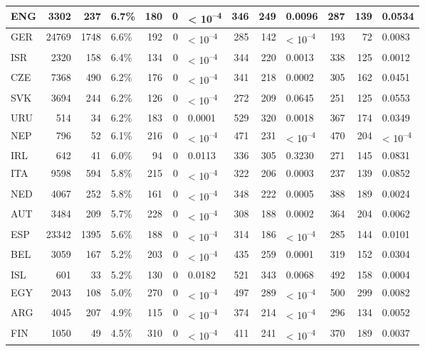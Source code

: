 \begin{tabular}{l|r|r|l|r|r|l|r|r|l|r|r|l}
\hline
ENG & 3302 & 237 & 6.7\% & 180 & 0 & < 10\textsuperscript{--4} & 346 & 249 & 0.0096 & 287 & 139 & 0.0534\\
\hline
GER & 24769 & 1748 & 6.6\% & 192 & 0 & < 10\textsuperscript{--4} & 285 & 142 & < 10\textsuperscript{--4} & 193 & 72 & 0.0083\\
\hline
ISR & 2320 & 158 & 6.4\% & 134 & 0 & < 10\textsuperscript{--4} & 344 & 220 & 0.0013 & 338 & 125 & 0.0012\\
\hline
CZE & 7368 & 490 & 6.2\% & 176 & 0 & < 10\textsuperscript{--4} & 341 & 218 & 0.0002 & 305 & 162 & 0.0451\\
\hline
SVK & 3694 & 244 & 6.2\% & 126 & 0 & < 10\textsuperscript{--4} & 272 & 209 & 0.0645 & 251 & 125 & 0.0553\\
\hline
URU & 514 & 34 & 6.2\% & 183 & 0 & 0.0001 & 529 & 320 & 0.0018 & 367 & 174 & 0.0349\\
\hline
NEP & 796 & 52 & 6.1\% & 216 & 0 & < 10\textsuperscript{--4} & 471 & 231 & < 10\textsuperscript{--4} & 470 & 204 & < 10\textsuperscript{--4}\\
\hline
IRL & 642 & 41 & 6.0\% & 94 & 0 & 0.0113 & 336 & 305 & 0.3230 & 271 & 145 & 0.0831\\
\hline
ITA & 9598 & 594 & 5.8\% & 215 & 0 & < 10\textsuperscript{--4} & 322 & 206 & 0.0003 & 237 & 139 & 0.0852\\
\hline
NED & 4067 & 252 & 5.8\% & 161 & 0 & < 10\textsuperscript{--4} & 348 & 222 & 0.0005 & 388 & 189 & 0.0024\\
\hline
AUT & 3484 & 209 & 5.7\% & 228 & 0 & < 10\textsuperscript{--4} & 308 & 188 & 0.0002 & 364 & 204 & 0.0062\\
\hline
ESP & 23342 & 1395 & 5.6\% & 188 & 0 & < 10\textsuperscript{--4} & 314 & 186 & < 10\textsuperscript{--4} & 285 & 144 & 0.0101\\
\hline
BEL & 3059 & 167 & 5.2\% & 203 & 0 & < 10\textsuperscript{--4} & 435 & 259 & 0.0001 & 319 & 152 & 0.0304\\
\hline
ISL & 601 & 33 & 5.2\% & 130 & 0 & 0.0182 & 521 & 343 & 0.0068 & 492 & 158 & 0.0004\\
\hline
EGY & 2043 & 108 & 5.0\% & 270 & 0 & < 10\textsuperscript{--4} & 497 & 289 & < 10\textsuperscript{--4} & 500 & 299 & 0.0082\\
\hline
ARG & 4045 & 207 & 4.9\% & 115 & 0 & < 10\textsuperscript{--4} & 374 & 214 & < 10\textsuperscript{--4} & 296 & 134 & 0.0052\\
\hline
FIN & 1050 & 49 & 4.5\% & 310 & 0 & < 10\textsuperscript{--4} & 411 & 241 & < 10\textsuperscript{--4} & 370 & 189 & 0.0037\\

\end{tabular}
